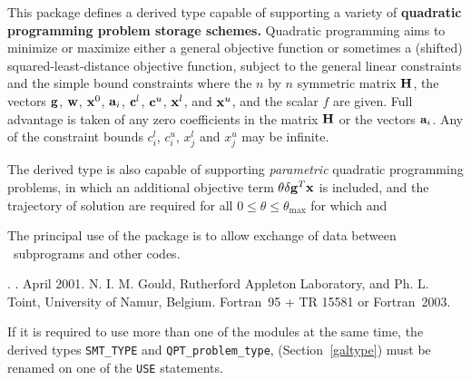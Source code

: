 \documentclass{galahad}
\newcommand{\packagename}{QPT}
\newcommand{\fullpackagename}{\libraryname\_\packagename}
\begin{document}
\galheader


\galsummary
This package defines a derived type capable of supporting
a variety of {\bf quadratic programming problem storage schemes.}
Quadratic programming aims to minimize or maximize either
a general objective function
or sometimes a (shifted) squared-least-distance objective function,
subject to the general linear constraints
and the simple bound constraints
where the $n$ by $n$ symmetric matrix ${\mathbf{H}}$,
the vectors ${\mathbf{g}}$, ${\mathbf{w}}$, ${\mathbf{x}}^{0}$,
${\mathbf{a}}_{i}$, ${\mathbf{c}}^{l}$, ${\mathbf{c}}^{u}$, ${\mathbf{x}}^{l}$,
and ${\mathbf{x}}^{u}$, and the scalar $f$ are given.
Full advantage is taken of any zero coefficients in the matrix ${\mathbf{H}}$ or the
vectors ${\mathbf{a}}_{i}$.
Any of the constraint bounds $c_{i}^{l}$, $c_{i}^{u}$,
$x_{j}^{l}$ and $x_{j}^{u}$ may be infinite.

The derived type is also capable of supporting {\em parametric}
quadratic programming problems, in which an additional objective
term $\theta \delta {\mathbf{g}}^T {\mathbf{x}}$ is included, and the trajectory of
solution are required for all $0 \leq \theta \leq \theta_{\max}$
for which
and

The principal use of the package is to allow exchange of data between
\galahad\ subprograms and other codes.


\galattributes
\galversions{\tt  \fullpackagename\_single, \fullpackagename\_double}.
.
\galdate April 2001.
\galorigin N. I. M. Gould, Rutherford Appleton Laboratory, and
Ph. L. Toint, University of Namur, Belgium.
\gallanguage Fortran~95 + TR 15581 or Fortran~2003.


\galhowto



\noindent
If it is required to use more than one of the modules at the same time, 
the derived types
{\tt SMT\_TYPE}
and
{\tt QPT\_problem\_type},
(Section~\ref{galtype})
must be renamed on one of the {\tt USE} statements.
\end{document}
